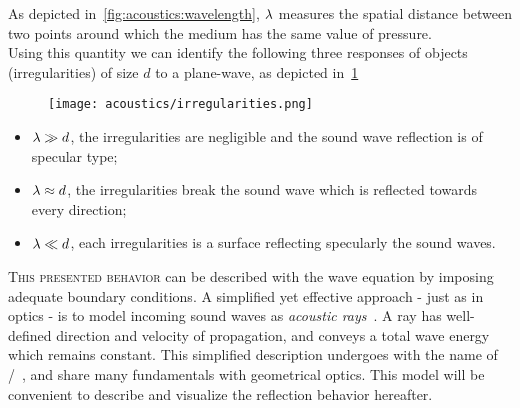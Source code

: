 As depicted in~\cref{fig:acoustics:wavelength}, $\lambda$ measures the spatial distance between two points around which the medium has the same value of pressure.
\\Using this quantity we can identify the following three responses of objects (irregularities) of size $d$ to a plane-wave, as depicted in~\cref{fig:acoustics:irregularities}
\begin{figure}
    \footnotesize
    \texttt{[image: acoustics/irregularities.png]}
    \label{fig:acoustics:irregularities}
\end{figure}
\begin{itemize}
    \item $\lambda \gg d$, the irregularities are negligible and the sound wave reflection is of specular type;
    \item $\lambda \approx d$, the irregularities break the sound wave which is reflected towards every direction;
    \item $\lambda \ll d$, each irregularities is a surface reflecting specularly the sound waves.
\end{itemize}

\textsc{This presented behavior} can be described with the wave equation by imposing adequate boundary conditions.
A simplified yet effective approach - just as in optics - is to model incoming sound waves as \textit{acoustic rays}~.
A ray has well-defined direction and velocity of propagation, and conveys a total wave energy which remains constant.
This simplified description undergoes with the name of \GAdef/~, and share many fundamentals with geometrical optics.
This model will be convenient to describe and visualize the reflection behavior hereafter.

